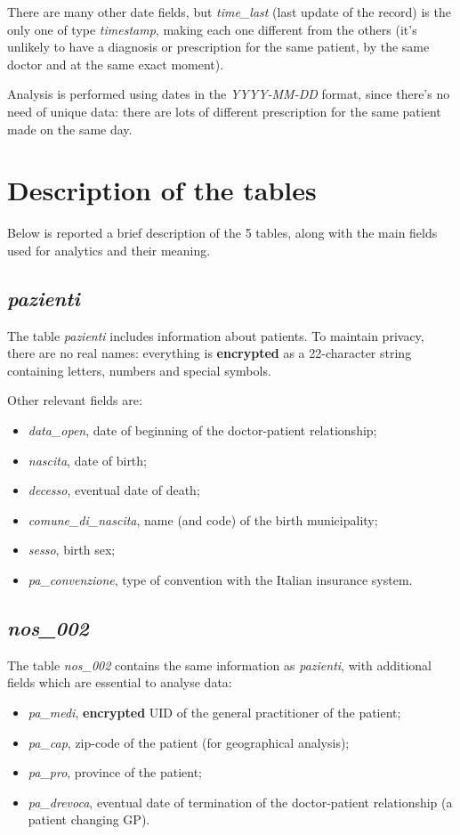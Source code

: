 There are many other date fields, but \textit{time\_last} (last update of the record) is the only one of type \textit{timestamp}, making each one different from the others (it's unlikely to have a diagnosis or prescription for the same patient, by the same doctor and at the same exact moment). 

Analysis is performed using dates in the \textit{YYYY-MM-DD} format, since there's no need of unique data: there are lots of different prescription for the same patient made on the same day.

\section{Description of the tables}
Below is reported a brief description of the 5 tables, along with the main fields used for analytics and their meaning.

\subsection{\textit{pazienti}}
The table \textit{pazienti} includes information about patients. To maintain privacy, there are no real names: everything is \textbf{encrypted} as a 22-character string containing letters, numbers and special symbols.

Other relevant fields are:
\begin{itemize}
	\item \textit{data\_open}, date of beginning of the doctor-patient relationship;
	\item \textit{nascita}, date of birth;
	\item \textit{decesso}, eventual date of death;
	\item \textit{comune\_di\_nascita}, name (and code) of the birth municipality;
	\item \textit{sesso}, birth sex;
	\item \textit{pa\_convenzione}, type of convention with the Italian insurance system.
\end{itemize}

\subsection{\textit{nos\_002}}
The table \textit{nos\_002} contains the same information as \textit{pazienti}, with additional fields which are essential to analyse data:
\begin{itemize}
	\item \textit{pa\_medi}, \textbf{encrypted} UID of the general practitioner of the patient;
	\item \textit{pa\_cap}, zip-code of the patient (for geographical analysis);
	\item \textit{pa\_pro}, province of the patient;
	\item \textit{pa\_drevoca}, eventual date of termination of the doctor-patient relationship (a patient changing GP).
\end{itemize}


